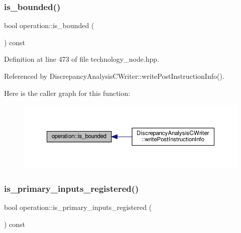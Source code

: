 \subsubsection{\texorpdfstring{is\+\_\+bounded()}{is\_bounded()}}
{\footnotesize\ttfamily bool operation\+::is\+\_\+bounded (\begin{DoxyParamCaption}{ }\end{DoxyParamCaption}) const\hspace{0.3cm}{\ttfamily [inline]}}



Definition at line 473 of file technology\+\_\+node.\+hpp.



Referenced by Discrepancy\+Analysis\+C\+Writer\+::write\+Post\+Instruction\+Info().

Here is the caller graph for this function\+:
\nopagebreak
\begin{figure}[H]
\begin{center}
\leavevmode
\includegraphics[width=350pt]{d9/dc0/structoperation_a28d9e2b1f452d667cdf74afa81d896ea_icgraph}
\end{center}
\end{figure}
\mbox{\label{structoperation_ab72f8bdde321945d4b616b562c4bc472}} 
\subsubsection{\texorpdfstring{is\+\_\+primary\+\_\+inputs\+\_\+registered()}{is\_primary\_inputs\_registered()}}
{\footnotesize\ttfamily bool operation\+::is\+\_\+primary\+\_\+inputs\+\_\+registered (\begin{DoxyParamCaption}{ }\end{DoxyParamCaption}) const\hspace{0.3cm}{\ttfamily [inline]}}




